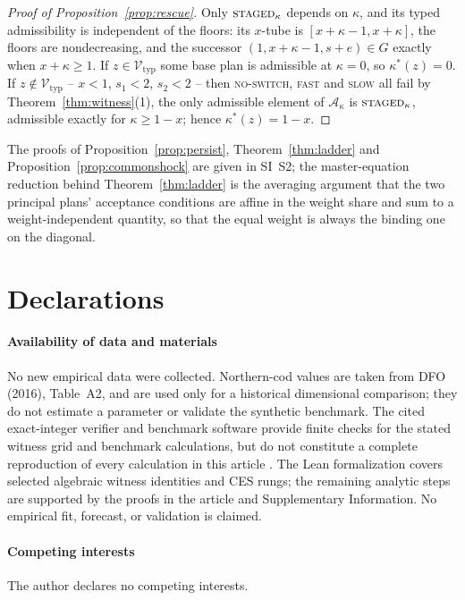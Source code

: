 \documentclass[preprint,11pt,authoryear]{elsarticle}
\theoremstyle{definition}
\theoremstyle{remark}
\newcommand{\Vtyp}{\mathcal{V}_{\mathrm{typ}}}
\newcommand{\act}[1]{\textsc{#1}}
\begin{document}
\begin{proof}[Proof of Proposition~\ref{prop:rescue}]
Only $\act{staged}_\kappa$ depends on $\kappa$, and its typed admissibility is independent of the floors: its $x$-tube is $[x+\kappa-1,x+\kappa]$, the floors are nondecreasing, and the successor $(1,x+\kappa-1,s+e)\in G$ exactly when $x+\kappa\ge1$. If $z\in\Vtyp$ some base plan is admissible at $\kappa=0$, so $\kappa^*(z)=0$. If $z\notin\Vtyp$ -- $x<1$, $s_1<2$, $s_2<2$ -- then \act{no-switch}, \act{fast} and \act{slow} all fail by Theorem~\ref{thm:witness}(1), the only admissible element of $\mathcal A_\kappa$ is $\act{staged}_\kappa$, admissible exactly for $\kappa\ge1-x$; hence $\kappa^*(z)=1-x$.
\end{proof}

\noindent The proofs of Proposition~\ref{prop:persist}, Theorem~\ref{thm:ladder} and Proposition~\ref{prop:commonshock} are given in SI~S2; the master-equation reduction behind Theorem~\ref{thm:ladder} is the averaging argument that the two principal plans' acceptance conditions are affine in the weight share and sum to a weight-independent quantity, so that the equal weight is always the binding one on the diagonal.

\section*{Declarations}
\paragraph{Availability of data and materials} No new empirical data were collected. Northern-cod values are taken from DFO (2016), Table~A2, and are used only for a historical dimensional comparison; they do not estimate a parameter or validate the synthetic benchmark. The cited exact-integer verifier and benchmark software provide finite checks for the stated witness grid and benchmark calculations, but do not constitute a complete reproduction of every calculation in this article \citep{Abaee2026code,Abaee2026software}. The Lean formalization covers selected algebraic witness identities and CES rungs; the remaining analytic steps are supported by the proofs in the article and Supplementary Information. No empirical fit, forecast, or validation is claimed.
\paragraph{Competing interests} The author declares no competing interests.
\end{document}
